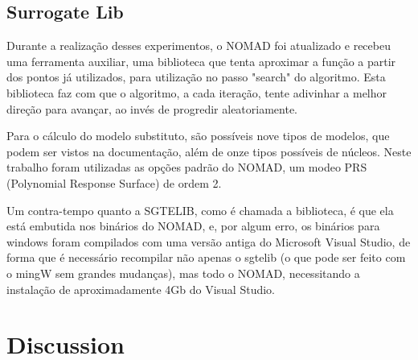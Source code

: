 \subsection{Surrogate Lib}

Durante a realização desses experimentos, o NOMAD foi atualizado e recebeu uma ferramenta auxiliar, uma biblioteca que tenta aproximar a função a partir dos pontos já utilizados, para utilização no passo "search" do algoritmo. Esta biblioteca faz com que o algoritmo, a cada iteração, tente adivinhar a melhor direção para avançar, ao invés de progredir aleatoriamente.

Para o cálculo do modelo substituto, são possíveis nove tipos de modelos, que podem ser vistos na documentação, além de onze tipos possíveis de núcleos. Neste trabalho foram utilizadas as opções padrão do NOMAD, um modeo PRS (Polynomial Response Surface) de ordem 2.

Um contra-tempo quanto a SGTELIB, como é chamada a biblioteca, é que ela está embutida nos binários do NOMAD, e, por algum erro, os binários para windows foram compilados com uma versão antiga do Microsoft Visual Studio, de forma que é necessário recompilar não apenas o sgtelib (o que pode ser feito com o mingW sem grandes mudanças), mas todo o NOMAD, necessitando a instalação de aproximadamente 4Gb do Visual Studio.




\section{Discussion}





